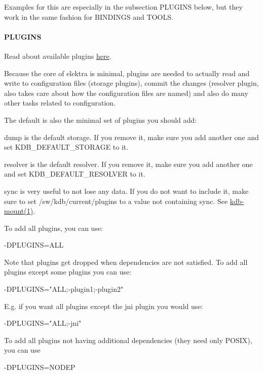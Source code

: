 Examples for this are especially in the subsection P\+L\+U\+G\+I\+N\+S below, but they work in the same fashion for B\+I\+N\+D\+I\+N\+G\+S and T\+O\+O\+L\+S.

\paragraph*{P\+L\+U\+G\+I\+N\+S}

Read about available plugins \hyperlink{md_src_plugins_README_src_plugins_README_md}{here}.

Because the core of elektra is minimal, plugins are needed to actually read and write to configuration files (storage plugins), commit the changes (resolver plugin, also takes care about how the configuration files are named) and also do many other tasks related to configuration.

The default is also the minimal set of plugins you should add\+:
\begin{DoxyItemize}
\item dump is the default storage. If you remove it, make sure you add another one and set {\ttfamily K\+D\+B\+\_\+\+D\+E\+F\+A\+U\+L\+T\+\_\+\+S\+T\+O\+R\+A\+G\+E} to it.
\item resolver is the default resolver. If you remove it, make sure you add another one and set {\ttfamily K\+D\+B\+\_\+\+D\+E\+F\+A\+U\+L\+T\+\_\+\+R\+E\+S\+O\+L\+V\+E\+R} to it.
\item sync is very useful to not lose any data. If you do not want to include it, make sure to set {\ttfamily /sw/kdb/current/plugins} to a value not containing sync. See \hyperlink{md_doc_help_kdb-mount_doc_help_kdb-mount_md}{kdb-\/mount(1)}.
\end{DoxyItemize}

To add all plugins, you can use\+: \begin{DoxyVerb}    -DPLUGINS=ALL
\end{DoxyVerb}


Note that plugins get dropped when dependencies are not satisfied. To add all plugins except some plugins you can use\+: \begin{DoxyVerb}    -DPLUGINS="ALL;-plugin1;-plugin2"
\end{DoxyVerb}


E.\+g. if you want all plugins except the jni plugin you would use\+: \begin{DoxyVerb}    -DPLUGINS="ALL;-jni"
\end{DoxyVerb}


To add all plugins not having additional dependencies (they need only P\+O\+S\+I\+X), you can use \begin{DoxyVerb}    -DPLUGINS=NODEP
\end{DoxyVerb}


